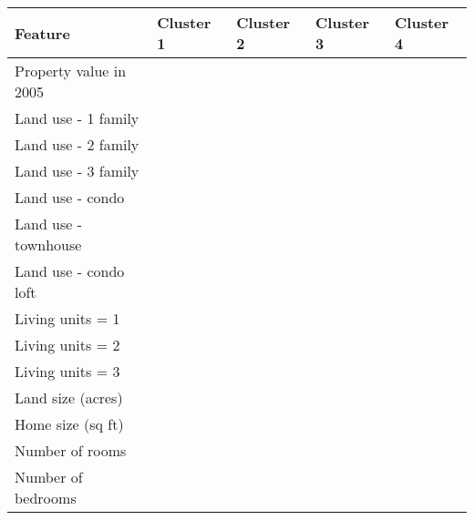 \documentclass{acm_proc_article-sp}
\begin{document}
\begin{table}[h!]
\centering
\begin{tabular}{l p{0.8cm}p{0.8cm}p{0.8cm}p{0.8cm}}
\toprule
Feature                & Cluster 1               & Cluster 2               & Cluster 3               & Cluster 4               \\ \midrule
Property value in 2005 & \cellcolor{darkgray}  & \cellcolor{black}     & \cellcolor{black}     & \cellcolor{darkgray}  \\
Land use - 1 family    & \cellcolor{gray}      & \cellcolor{gray}      &                         & \cellcolor{lightgray} \\
Land use - 2 family    & \cellcolor{lightgray} &                         &                         &                         \\
Land use - 3 family    &                         &                         &                         &                         \\
Land use - condo       & \cellcolor{gray}      & \cellcolor{darkgray}  & \cellcolor{lightgray} & \cellcolor{lightgray} \\
Land use - townhouse   & \cellcolor{gray}      & \cellcolor{gray}      & \cellcolor{gray}      & \cellcolor{lightgray} \\
Land use - condo loft  & \cellcolor{gray}      & \cellcolor{lightgray} & \cellcolor{lightgray} & \cellcolor{lightgray} \\
Living units = 1       & \cellcolor{lightgray} &                         &                         &                         \\
Living units = 2       & \cellcolor{lightgray} &                         &                         &                         \\
Living units = 3       &                         &                         &                         &                         \\
Land size (acres)      & \cellcolor{darkgray}  & \cellcolor{darkgray}  & \cellcolor{gray}      & \cellcolor{gray}      \\
Home size (sq ft)      & \cellcolor{darkgray}  & \cellcolor{darkgray}  & \cellcolor{darkgray}  & \cellcolor{gray}      \\
Number of rooms        & \cellcolor{gray}      & \cellcolor{darkgray}  & \cellcolor{gray}      & \cellcolor{lightgray} \\
Number of bedrooms     & \cellcolor{gray}      & \cellcolor{lightgray} &                         & \cellcolor{lightgray} \\

\end{tabular}
\end{table}
\end{document}
